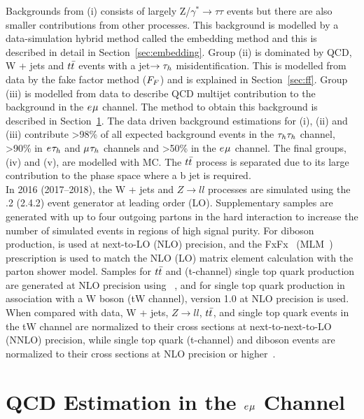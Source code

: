 Backgrounds from (i) consists of largely Z/$\gamma^* \rightarrow \tau\tau$ events but there are also smaller contributions from other processes. 
This background is modelled by a data-simulation hybrid method called the embedding method and this is described in detail in Section~\ref{sec:embedding}.
Group (ii) is dominated by QCD, W + jets and $t\bar{t}$ events with a jet$\rightarrow \tau_{h}$ misidentification.
This is modelled from data by the fake factor method ($F_{F}$) and is explained in Section~\ref{sec:ff}.
Group (iii) is modelled from data to describe QCD multijet contribution to the background in the $e_{}\mu_{}$ channel.
The method to obtain this background is described in Section~\ref{sec:qcd}.
The data driven background estimations for (i), (ii) and (iii) contribute >98\% of all expected background events in the $\tau_{h}\tau_{h}$ channel, >90\% in $e_{}\tau_{h}$ and $\mu_{}\tau_{h}$ channels and >50\% in the $e_{}\mu_{}$ channel.
The final groups, (iv) and (v), are modelled with MC.
The $t\bar{t}$ process is separated due to its large contribution to the phase space where a b jet is required. \\

In 2016 (2017--2018), the W + jets and $Z\rightarrow ll$ processes are simulated using the .2 (2.4.2) event generator at leading order (LO). 
Supplementary samples are generated with up to four outgoing partons in the hard interaction to increase the number of simulated events in regions of high signal purity. 
For diboson production, \MGvATNLO is used at next-to-LO (NLO) precision, and the FxFx~\cite{Frederix:2012ps} (MLM~\cite{Alwall:2007fs}) prescription is used to match the NLO (LO) matrix element calculation with the parton shower model. 
Samples for $t\bar{t}$\cite{Alioli:2011as} and (t-channel) single top quark production\cite{Frederix:2012dh} are generated at NLO precision using ~\cite{Nason:2004rx,Frixione:2007vw,Alioli:2010xd,Jezo:2015aia}, and for single top quark production in association with a W boson (tW channel)\cite{Re:2010bp}, \POWHEG version 1.0 at NLO precision is used. 
When compared with data, W + jets, $Z\rightarrow ll$, $t\bar{t}$, and single top quark events in the tW channel are normalized to their cross sections at next-to-next-to-LO (NNLO) precision\cite{Melnikov:2006kv,Czakon2011xx,Kidonakis:2013zqa}, while single top quark (t-channel) and diboson events are normalized to their cross sections at NLO precision or higher~\cite{Kidonakis:2013zqa,Campbell:2011bn,Gehrmann:2014fva}.

\section{QCD Estimation in the $e_{}\mu_{}$ Channel}
\label{sec:qcd}

